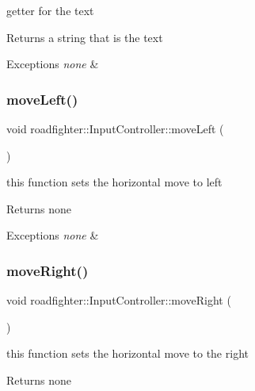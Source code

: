 getter for the text \begin{DoxyReturn}{Returns}
a string that is the text 
\end{DoxyReturn}

\begin{DoxyExceptions}{Exceptions}
{\em none} & \\
\hline
\end{DoxyExceptions}
\mbox{\label{classroadfighter_1_1InputController_a3c22763233f67e98dfbd5dc2774804f7}} 
\subsubsection{\texorpdfstring{move\+Left()}{moveLeft()}}
{\footnotesize\ttfamily void roadfighter\+::\+Input\+Controller\+::move\+Left (\begin{DoxyParamCaption}{ }\end{DoxyParamCaption})}

this function sets the horizontal move to left \begin{DoxyReturn}{Returns}
none 
\end{DoxyReturn}

\begin{DoxyExceptions}{Exceptions}
{\em none} & \\
\hline
\end{DoxyExceptions}
\mbox{\label{classroadfighter_1_1InputController_ae67a4ee406d64253bf62b90b766f28bb}} 
\subsubsection{\texorpdfstring{move\+Right()}{moveRight()}}
{\footnotesize\ttfamily void roadfighter\+::\+Input\+Controller\+::move\+Right (\begin{DoxyParamCaption}{ }\end{DoxyParamCaption})}

this function sets the horizontal move to the right \begin{DoxyReturn}{Returns}
none 
\end{DoxyReturn}

